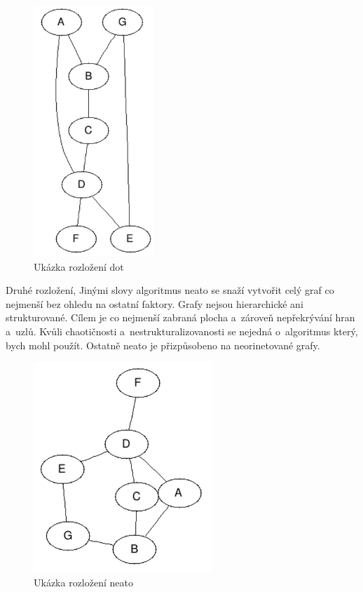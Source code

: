 \documentclass[color,table,oneside,nolot,nolof]{fithesis}
\begin{document}
\begin{figure}[h!]
	\label{fig:Ukázka rozložení dot}
	\caption{Ukázka rozložení dot}
	\centering
	\includegraphics[width=0.4\textwidth]{pictures/dot_example.png} 
\end{figure}

	Druhé rozložení, \cite{graphviz_layout}
	Jinými slovy algoritmus neato se snaží vytvořit celý graf co nejmenší bez ohledu na ostatní faktory. Grafy nejsou hierarchické ani 
	strukturované. Cílem je co nejmenší zabraná plocha a~zároveň nepřekrývání hran a~uzlů. Kvůli chaotičnosti a~nestrukturalizovanosti se nejedná o~algoritmus který, bych mohl
	použít. Ostatně neato je přizpůsobeno na neorinetované grafy.

\begin{figure}[h!]
	\label{fig:Ukázka rozložení neato}
	\caption{Ukázka rozložení neato}
	\centering
	\includegraphics[width=0.6\textwidth]{pictures/neato_example.png} 
\end{figure}
\end{document}
